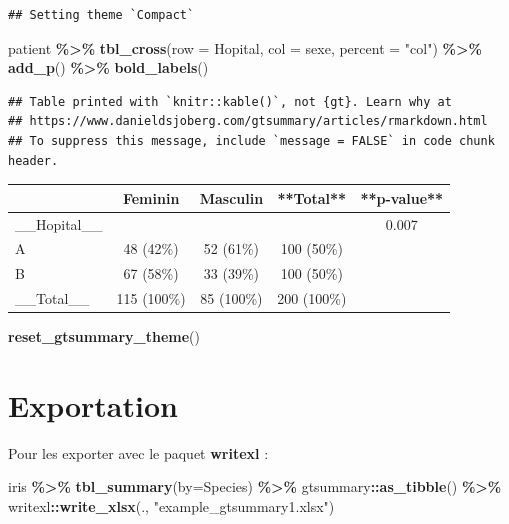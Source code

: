 \documentclass[
]{book}
\newenvironment{Shaded}{\begin{snugshade}}{\end{snugshade}}
\newcommand{\AttributeTok}[1]{\textcolor[rgb]{0.13,0.29,0.53}{#1}}
\newcommand{\FunctionTok}[1]{\textcolor[rgb]{0.13,0.29,0.53}{\textbf{#1}}}
\newcommand{\NormalTok}[1]{#1}
\newcommand{\SpecialCharTok}[1]{\textcolor[rgb]{0.81,0.36,0.00}{\textbf{#1}}}
\newcommand{\StringTok}[1]{\textcolor[rgb]{0.31,0.60,0.02}{#1}}
\begin{document}
\begin{verbatim}
## Setting theme `Compact`
\end{verbatim}

\begin{Shaded}
\begin{Highlighting}[]
\NormalTok{patient }\SpecialCharTok{\%\textgreater{}\%}
  \FunctionTok{tbl\_cross}\NormalTok{(}\AttributeTok{row =}\NormalTok{ Hopital, }\AttributeTok{col =}\NormalTok{ sexe, }\AttributeTok{percent =} \StringTok{"col"}\NormalTok{) }\SpecialCharTok{\%\textgreater{}\%}
  \FunctionTok{add\_p}\NormalTok{() }\SpecialCharTok{\%\textgreater{}\%}
  \FunctionTok{bold\_labels}\NormalTok{()}
\end{Highlighting}
\end{Shaded}

\begin{verbatim}
## Table printed with `knitr::kable()`, not {gt}. Learn why at
## https://www.danieldsjoberg.com/gtsummary/articles/rmarkdown.html
## To suppress this message, include `message = FALSE` in code chunk header.
\end{verbatim}

\begin{tabular}{l|c|c|c|c}
\hline
 & Feminin & Masculin & **Total** & **p-value**\\
\hline
\_\_Hopital\_\_ &  &  &  & 0.007\\
\hline
A & 48 (42\%) & 52 (61\%) & 100 (50\%) & \\
\hline
B & 67 (58\%) & 33 (39\%) & 100 (50\%) & \\
\hline
\_\_Total\_\_ & 115 (100\%) & 85 (100\%) & 200 (100\%) & \\
\hline
\end{tabular}

\begin{Shaded}
\begin{Highlighting}[]
\FunctionTok{reset\_gtsummary\_theme}\NormalTok{()}
\end{Highlighting}
\end{Shaded}

\hypertarget{exportation}{%
\section{Exportation}\label{exportation}}

Pour les exporter avec le paquet \textbf{writexl} :

\begin{Shaded}
\begin{Highlighting}[]
\NormalTok{iris }\SpecialCharTok{\%\textgreater{}\%} \FunctionTok{tbl\_summary}\NormalTok{(}\AttributeTok{by=}\NormalTok{Species) }\SpecialCharTok{\%\textgreater{}\%}
\NormalTok{  gtsummary}\SpecialCharTok{::}\FunctionTok{as\_tibble}\NormalTok{() }\SpecialCharTok{\%\textgreater{}\%} 
\NormalTok{  writexl}\SpecialCharTok{::}\FunctionTok{write\_xlsx}\NormalTok{(., }\StringTok{"example\_gtsummary1.xlsx"}\NormalTok{)}
\end{Highlighting}
\end{Shaded}
\end{document}
